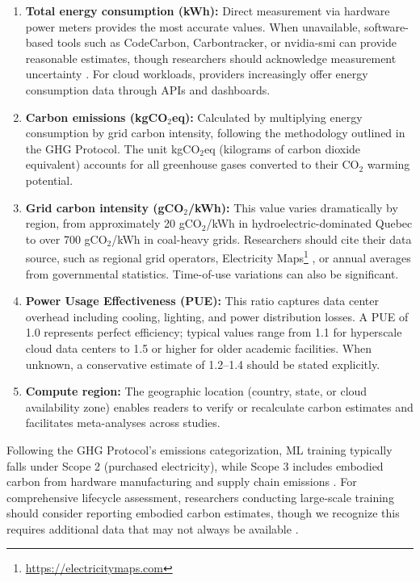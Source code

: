 \documentclass{article}
\theoremstyle{plain}
\theoremstyle{definition}
\theoremstyle{remark}
\begin{document}
\begin{enumerate}
    \item \textbf{Total energy consumption (kWh):} Direct measurement via hardware power meters provides the most accurate values. When unavailable, software-based tools such as CodeCarbon, Carbontracker, or nvidia-smi can provide reasonable estimates, though researchers should acknowledge measurement uncertainty \cite{jay2023experimental}. For cloud workloads, providers increasingly offer energy consumption data through APIs and dashboards.

    \item \textbf{Carbon emissions (kgCO$_2$eq):} Calculated by multiplying energy consumption by grid carbon intensity, following the methodology outlined in the GHG Protocol. The unit kgCO$_2$eq (kilograms of carbon dioxide equivalent) accounts for all greenhouse gases converted to their CO$_2$ warming potential.

    \item \textbf{Grid carbon intensity (gCO$_2$/kWh):} This value varies dramatically by region, from approximately 20 gCO$_2$/kWh in hydroelectric-dominated Quebec to over 700 gCO$_2$/kWh in coal-heavy grids. Researchers should cite their data source, such as regional grid operators, Electricity Maps\footnote{\url{https://electricitymaps.com}} \cite{electricitymap2023}, or annual averages from governmental statistics. Time-of-use variations can also be significant.

    \item \textbf{Power Usage Effectiveness (PUE):} This ratio captures data center overhead including cooling, lighting, and power distribution losses. A PUE of 1.0 represents perfect efficiency; typical values range from 1.1 for hyperscale cloud data centers to 1.5 or higher for older academic facilities. When unknown, a conservative estimate of 1.2--1.4 should be stated explicitly.

    \item \textbf{Compute region:} The geographic location (country, state, or cloud availability zone) enables readers to verify or recalculate carbon estimates and facilitates meta-analyses across studies.
\end{enumerate}

Following the GHG Protocol's emissions categorization, ML training typically falls under Scope 2 (purchased electricity), while Scope 3 includes embodied carbon from hardware manufacturing and supply chain emissions \cite{gupta2022chasing}. For comprehensive lifecycle assessment, researchers conducting large-scale training should consider reporting embodied carbon estimates, though we recognize this requires additional data that may not always be available \cite{ligozat2022unraveling}.
\end{document}
